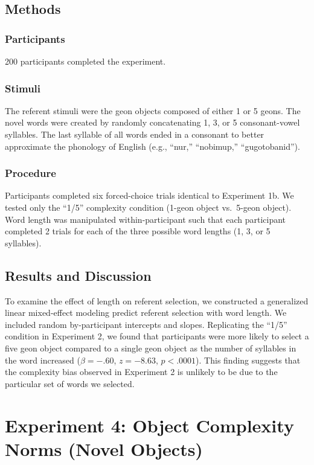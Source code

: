 \documentclass[man]{apa2}
\begin{document}
\subsection{Methods}
\subsubsection{Participants} 200 participants completed the experiment.
\subsubsection{Stimuli} The referent stimuli were the geon objects composed of either 1 or 5 geons. The novel words were created by randomly concatenating 1, 3, or 5 consonant-vowel syllables. The last syllable of all words ended in a consonant to better approximate the phonology of English (e.g., ``nur,'' ``nobimup,'' ``gugotobanid'').

\subsubsection{Procedure}
Participants completed six forced-choice trials identical to Experiment 1b. We tested only the ``1/5'' complexity condition (1-geon object vs.\ 5-geon object). Word length was manipulated within-participant such that each participant completed 2 trials for each of the three possible word lengths (1, 3, or 5 syllables).

\subsection{Results and Discussion}
To examine the effect of length on referent selection, we constructed a generalized linear mixed-effect modeling predict referent selection with word length. We included random by-participant intercepts and slopes. Replicating the ``1/5'' condition in Experiment 2, we found that participants were more likely to select a five geon object compared to a single geon object as the number of syllables in the word increased ($\beta=-.60$, $z =-8.63$, $p <.0001$). This finding suggests that the complexity bias observed in Experiment 2 is unlikely to be due to the particular set of words we selected.

\section{Experiment 4: Object Complexity Norms (Novel Objects)}
\end{document}
